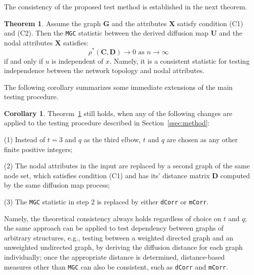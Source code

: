 \documentclass[11pt]{article}
\theoremstyle{definition}
\newtheorem{theorem}{Theorem}
\newtheorem{corollary}{Corollary}
\begin{document}
The consistency of the proposed test method is established in the next theorem.

\begin{theorem}
Assume the graph $\mathbf{G}$ and the attributes $\mathbf{X}$ satisfy condition (C1) and (C2). Then the \texttt{MGC} statistic between the derived diffusion map $\mathbf{U}$ and the nodal attributes $\mathbf{X}$ satisfies:
\begin{equation}
\rho^{*}(\mathbf{C}, \mathbf{D}) \longrightarrow 0 \mbox{ as } n \rightarrow \infty
\end{equation}
if and only if $u$ is independent of $x$. Namely, it is a consistent statistic for testing independence between the network topology and nodal attributes.
	\label{theoremMain}
\end{theorem} 

The following corollary summarizes some immediate extensions of the main testing procedure.

\begin{corollary}
\label{main_corollary}
Theorem~\ref{theoremMain} still holds, when any of the following changes are applied to the testing procedure described in Section~\ref{ssec:method}:
\begin{description}[align=left]
\item [] (1) Instead of $t=3$ and $q$ as the third elbow, $t$ and $q$ are chosen as any other finite positive integers;

\item [] (2) The nodal attributes in the input are replaced by a second graph of the same node set, which satisfies condition (C1) and has its' distance matrix $\mathbf{D}$ computed by the same diffusion map process;

\item [] (3) The \texttt{MGC} statistic in step 2 is replaced by either \texttt{dCorr} or \texttt{mCorr}.
\end{description}
\end{corollary}

Namely, the theoretical consistency always holds regardless of choice on $t$ and $q$; the same approach can be applied to test dependency between graphs of arbitrary structures, e.g., testing between a weighted directed graph and an unweighted undirected graph, by deriving the diffusion distance for each graph individually; once the appropriate distance is determined, distance-based measures other than \texttt{MGC} can also be consistent, such as \texttt{dCorr} and \texttt{mCorr}. 
\end{document}
